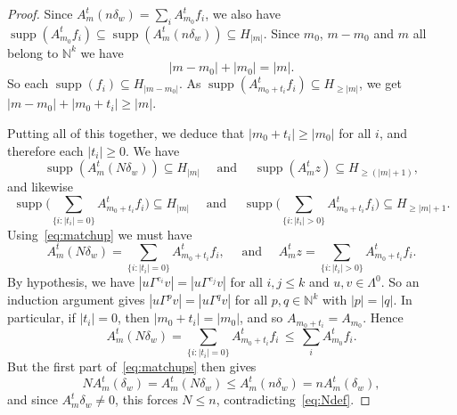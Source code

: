 \documentclass[a4paper, 12pt]{amsart}
\numberwithin{equation}{section}
\theoremstyle{remark}
\theoremstyle{definition}
\begin{document}
\begin{proof}
Since $A^t_m (n \delta_w)=\sum_iA^t_{m_0}f_i$, we also have ${\operatorname{supp}}(A^t_{m_0} f_i)
\subseteq {\operatorname{supp}}(A^t_m(n\delta_w)) \subseteq H_{|m|}$. Since $m_0$, $m - m_0$ and $m$ all
belong to ${\mathbb{N}}^k$ we have
$$|m-m_0| + |m_0| = |m|.$$
So each ${\operatorname{supp}}(f_i) \subseteq H_{|m - m_0|}$. As ${\operatorname{supp}}(A^t_{m_0+t_i}f_i) \subseteq
H_{\ge |m|}$, we get $|m-m_0|+|m_0+t_i|\geq |m|$.

Putting all of this together, we deduce that $|m_0 + t_i| \ge |m_0|$ for all $i$, and
therefore each $|t_i| \ge 0$. We have
\[
{\operatorname{supp}}(A^t_m (N\delta_{w})) \subseteq H_{|m|}\quad\text{ and }\quad
    {\operatorname{supp}}(A^t_m z) \subseteq H_{\ge (|m|+1)},
\]
and likewise
\[
{\operatorname{supp}}\Big(\sum_{\{i : |t_i| = 0\}} A^t_{m_0+t_i}f_i\Big) \subseteq H_{|m|}
    \quad\text{ and }\quad {\operatorname{supp}}\Big(\sum_{\{i: |t_i| > 0\}} A^t_{m_0+t_i}f_i\Big) \subseteq H_{\ge |m|+1}.
\]
Using~\eqref{eq:matchup} we must have
\[
A^t_m (N\delta_{w}) = \sum_{\{i: |t_i| = 0\}} A^t_{m_0+t_i}f_i, \quad\text{ and }\quad
    A^t_m z = \sum_{\{i: |t_i| > 0\}} A^t_{m_0+t_i}f_i.
\]
By hypothesis, we have $|u \Gamma^{e_i} v| = |u \Gamma^{e_j} v|$ for all $i,j \le k$ and
$u,v \in \Lambda^0$. So an induction argument gives $|u \Gamma^p v| = |u \Gamma^q v|$ for all $p,q
\in {\mathbb{N}}^k$ with $|p| = |q|$. In particular, if $|t_i| = 0$, then $|m_0 + t_i| = |m_0|$,
and so $A_{m_0 + t_i} = A_{m_0}$. Hence
\[
A^t_m (N\delta_{w}) = \sum_{\{i: |t_i| = 0\}} A^t_{m_0+t_i}f_i \,\leq\, \sum_i A^t_{m_0}f_i.
\]
But the first part of~\eqref{eq:matchups} then gives
\[
N A^t_m (\delta_{w}) = A^t_m(N \delta_w) \leq  A^t_m(n\delta_{w}) = n A^t_m(\delta_w),
\]
and since $A^t_m \delta_w \not= 0$, this forces $N \leq n$,
contradicting~\eqref{eq:Ndef}.
\end{proof}
\end{document}
